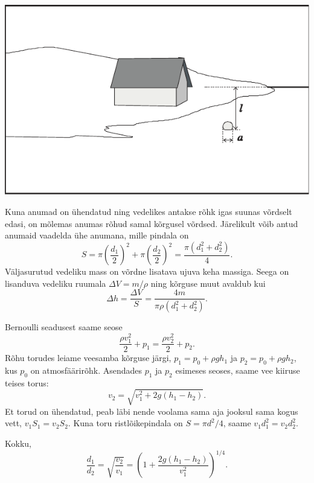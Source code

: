 \documentclass[10pt]{article}
\begin{document}
{\begin{center}
	\includegraphics[width=0.9\linewidth]{2008-lahg-09-lah}
\end{center}
\probend
\bigskip


\solu
Kuna anumad on ühendatud ning vedelikes antakse rõhk igas suunas võrdselt edasi, on mõlemas anumas rõhud samal kõrgusel võrdsed. Järelikult võib antud anumaid vaadelda ühe anumana, mille pindala on
\[
S=\pi\left(\frac{d_{1}}{2}\right)^{2}+\pi\left(\frac{d_{2}}{2}\right)^{2}=\frac{\pi\left(d_{1}^{2}+d_{2}^{2}\right)}{4}.
\]
Väljasurutud vedeliku mass on võrdne lisatava ujuva keha massiga. Seega on lisanduva vedeliku ruumala $\Delta V = m/\rho$ ning kõrguse muut avaldub kui
\[
\Delta h=\frac{\Delta V}{S}=\frac{4 m}{\pi \rho\left(d_{1}^{2}+d_{2}^{2}\right)}.
\]
\probend
\bigskip


\solu
Bernoulli seadusest saame seose 
\[
\frac{\rho v_1^2}{2}+p_1=\frac{\rho v_2^2}{2}+p_2.
\]
Rõhu torudes leiame veesamba kõrguse järgi, $p_1=p_0 + \rho g h_1$ ja $p_2=p_0 + \rho g h_2$, kus $p_0$ on atmosfäärirõhk.
Asendades $p_1$ ja $p_2$ esimeses seoses, saame vee kiiruse teises torus:
\[
v_2=\sqrt{v_1^2+2g(h_1-h_2)}.
\]
Et torud on ühendatud, peab läbi nende voolama sama aja jooksul sama kogus vett, $v_1 S_1 = v_2 S_2$.
Kuna toru ristlõikepindala on $S=\pi d^2 / 4$, saame $v_1 d_1^2 = v_2 d_2^2$.

Kokku,
\[
\frac{d_1}{d_2}=\sqrt{\frac{v_2}{v_1}}=\left(1+\frac{2g(h_1-h_2)}{v_1^2}\right)^{1/4}.
\]
\probend
\bigskip

}
\end{document}

